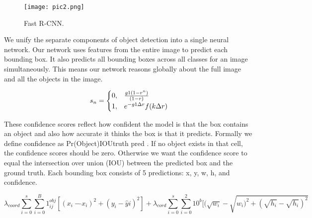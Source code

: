 \documentclass[12pt,a4paper]{article}
\begin{document}
\begin{figure}[!ht]
\centering
\texttt{[image: pic2.png]}
\caption{\label{pic2.png}Fast R-CNN. }
\end{figure}

We unify the separate components of object detection into a single neural network. Our network uses features from the entire image to predict each bounding box. It also predicts all bounding boxes across all classes for an image simultaneously. This means our network reasons globally about the full image and all the objects in the image. 

\begin{equation}
\label{eq4}
    s_n = 
    \begin{cases}
    0, &\text{$\frac{g1(1-r^n )}{(1-r)}$}\\
    1, &\text{$ e^{-g1\Delta r} f(k\Delta r)$}
    \end{cases}
\end{equation}


These confidence scores reflect how confident the model is that the box contains an object and also how accurate it thinks the box is that it predicts. Formally we define confidence as Pr(Object)IOUtruth pred . If no object exists in that cell, the confidence scores should be zero. Otherwise we want the confidence score to equal the intersection over union (IOU) between the predicted box and the ground truth. Each bounding box consists of 5 predictions: x, y, w, h, and confidence.

\begin{equation}
     \lambda _ {coord} \sum _ {i=0}^ {s} \sum _ {i=0}^ {B} 1_ {ij}^ {obj} [  (x_ {i}-\widehat {}x_ {i})^ {2}  +  (y_ {i}-\widehat {y}i)^ {2} ]
+ \lambda _ {cord} \sum _ {i=0}^ {s}  \sum _ {i=0}^ {2}  10^ {b} [( \sqrt {w_ {i}}  -  \sqrt {w_ {i})^ {2}+(\sqrt {h_ {i}}-\sqrt {h_ {i}})^ {2}} 

\end{equation}
\end{document}
